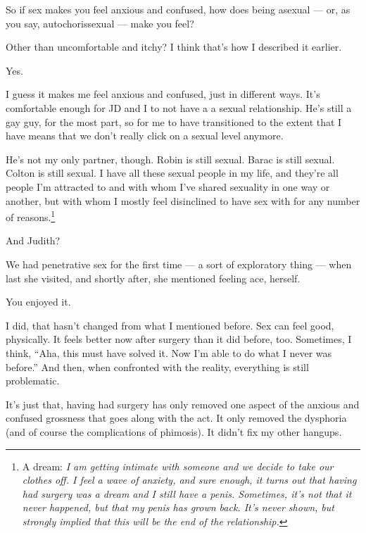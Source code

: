 \begin{paracol}{2}
\begin{leftcolumn}
\begin{ally}
So if sex makes you feel anxious and confused, how does being asexual --- or, as you say, autochorissexual --- make you feel?
\end{ally}
Other than uncomfortable and itchy? I think that's how I described it earlier.

\begin{ally}
Yes.
\end{ally}
I guess it makes me feel anxious and confused, just in different ways. It's comfortable enough for JD and I to not have a a sexual relationship. He's still a gay guy, for the most part, so for me to have transitioned to the extent that I have means that we don't really click on a sexual level anymore.

He's not my only partner, though. Robin is still sexual. Barac is still sexual. Colton is still sexual. I have all these sexual people in my life, and they're all people I'm attracted to and with whom I've shared sexuality in one way or another, but with whom I mostly feel disinclined to have sex with for any number of reasons.\footnote{A dream: \emph{I am getting intimate with someone and we decide to take our clothes off. I feel a wave of anxiety, and sure enough, it turns out that having had surgery was a dream and I still have a penis. Sometimes, it's not that it never happened, but that my penis has grown back. It's never shown, but strongly implied that this will be the end of the relationship.}}

\begin{ally}
And Judith?
\end{ally}
We had penetrative sex for the first time --- a sort of exploratory thing --- when last she visited, and shortly after, she mentioned feeling ace, herself.

\begin{ally}
You enjoyed it.
\end{ally}
I did, that hasn't changed from what I mentioned before. Sex can feel good, physically. It feels better now after surgery than it did before, too. Sometimes, I think, ``Aha, this must have solved it. Now I'm able to do what I never was before.'' And then, when confronted with the reality, everything is still problematic.

It's just that, having had surgery has only removed one aspect of the anxious and confused grossness that goes along with the act. It only removed the dysphoria (and of course the complications of phimosis). It didn't fix my other hangups.


\end{leftcolumn}
\end{paracol}
